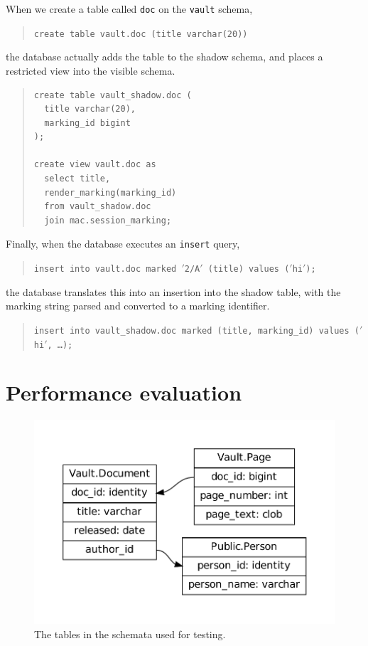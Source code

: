 \documentclass[twocolumn]{article}
\begin{document}
When we create a table called {\tt doc} on the {\tt vault} schema,

\begin{quote}
{\tt create table vault.doc (title varchar(20))}
\end{quote}

the database actually adds the table to the shadow schema, and places a restricted view into the visible schema.

\begin{quote}\begin{verbatim}
create table vault_shadow.doc (
  title varchar(20),
  marking_id bigint
);

create view vault.doc as
  select title,
  render_marking(marking_id)
  from vault_shadow.doc
  join mac.session_marking;
\end{verbatim}\end{quote}

Finally, when the database executes an {\tt insert} query,

\begin{quote}
{\tt insert into vault.doc marked $'$2/A$'$ (title) values ($'$hi$'$);}
\end{quote}

the database translates this into an insertion into the shadow table, with the marking string parsed and converted to a marking identifier.

\begin{quote}
{\tt insert into vault\_shadow.doc marked (title, marking\_id) values ($'$hi$'$, \ldots);}
\end{quote}

\section{Performance evaluation}

\begin{figure}
  \begin{center}
    \includegraphics[width=\linewidth]{test-schema.pdf}
  \end{center}
  \caption{The tables in the schemata used for testing.}
  \label{fig:test-schema}
\end{figure}
\end{document}
